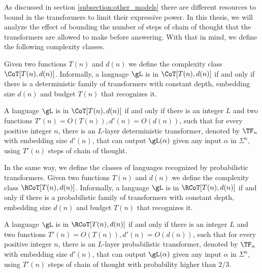 As discussed in section \ref{subsection:other_models} there are different resources to bound in the transformers to limit their expressive power.
In this thesis, we will analyze the effect of bounding the number of steps of chain of thought that the transformers are allowed to make before answering.
With that in mind, we define the following complexity classes.


\medskip

Given two functions $T(n)$ and $d(n)$ we define the complexity class $\CoT[T(n), d(n)]$.
Informally, a language $\gL$ is in $\CoT[T(n), d(n)]$ if and only if there is a deterministic family of transformers with constant depth, embedding size $d(n)$ and budget $T(n)$ that recognizes it.

\begin{definition}[$\CoTtndn$]
    A language $\gL$ is in $\CoT[T(n), d(n)]$ if and only if there is an integer $L$ and two functions $T'(n) = O(T(n)), d'(n) = O(d(n))$, such that for every positive integer $n$, there is an $L$-layer deterministic transformer, denoted by $\TF_n$ with embedding size $d'(n)$, that can output $\gL(\alpha)$ given any input $\alpha$ in $\Sigma^n$, using $T'(n)$ steps of chain of thought.    
\end{definition}



\smallskip

In the same way, we define the classes of languages recognized by probabilistic transformers.
Given two functions $T(n)$ and $d(n)$ we define the complexity class $\RCoT[T(n), d(n)]$.
Informally, a language $\gL$ is in $\RCoT[T(n), d(n)]$ if and only if there is a probabilistic family of transformers with constant depth, embedding size $d(n)$ and budget $T(n)$ that recognizes it.

\begin{definition}[$\RCoTtndn$]
    A language $\gL$ is in $\RCoT[T(n), d(n)]$ if and only if there is an integer $L$ and two functions $T'(n) = O(T(n)), d'(n) = O(d(n))$, such that for every positive integer $n$, there is an $L$-layer probabilistic transformer, denoted by $\TF_n$ with embedding size $d'(n)$, that can output $\gL(\alpha)$ given any input $\alpha$ in $\Sigma^n$, using $T'(n)$ steps of chain of thought with probability higher than $2/3$.
\end{definition}


